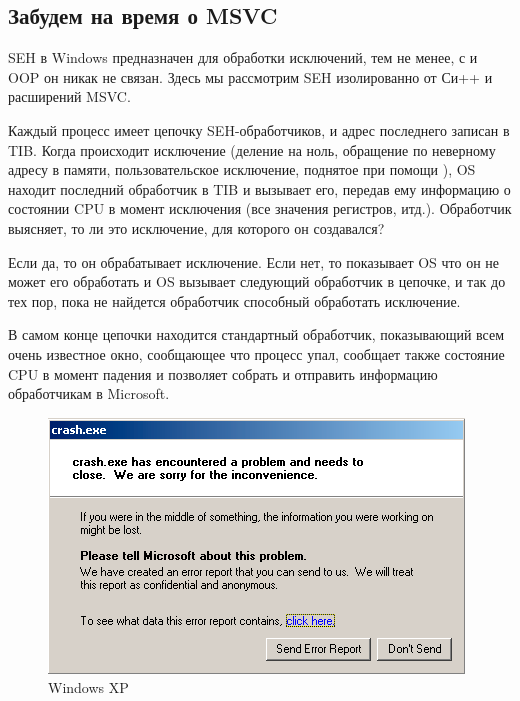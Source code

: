 \subsection{Забудем на время о MSVC}

\ac{SEH} в Windows предназначен для обработки исключений, тем не менее, с \Cpp и \ac{OOP} он никак не связан.
Здесь мы рассмотрим \ac{SEH} изолированно от Си++ и расширений MSVC.

Каждый процесс имеет цепочку \ac{SEH}-обработчиков, и адрес последнего записан в \ac{TIB}.
Когда происходит исключение (деление на ноль, обращение по неверному адресу в памяти, 
пользовательское исключение, поднятое при помощи ),
\ac{OS} находит последний обработчик в \ac{TIB} и вызывает его, 
передав ему информацию о состоянии \ac{CPU} в момент исключения
(все значения регистров, итд.).
Обработчик выясняет, то ли это исключение, для которого он создавался?

Если да, то он обрабатывает исключение.
Если нет, то показывает \ac{OS} что он не может его обработать и \ac{OS} вызывает следующий обработчик
в цепочке, и так до тех пор, пока не найдется обработчик способный обработать исключение.

В самом конце цепочки находится стандартный обработчик, показывающий всем очень известное окно, 
сообщающее что процесс упал, 
сообщает также состояние \ac{CPU} в момент падения и позволяет собрать и отправить информацию обработчикам 
в Microsoft. 

\begin{figure}[H]
\centering
\includegraphics[scale=\NormalScale]{OS/SEH/1/crash_xp1.png}
\caption{Windows XP}
\end{figure}

